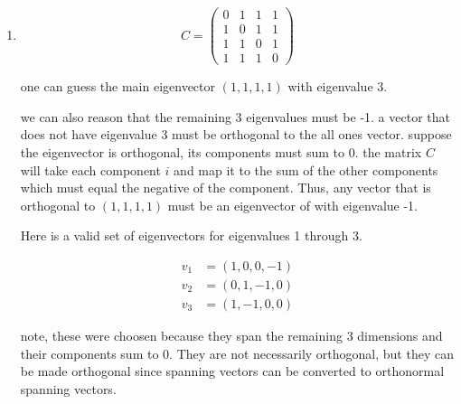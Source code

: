\documentclass{article}
\begin{document}
\begin{enumerate}
for eigenvectors, we know \(v_0=(1,1,1,1)\)

we can also guess \(v_2 = (1,-1,-1,1)\) and it verifies to be correct. 

the final two we can also guess, the diagonal is \(1\pm\sqrt{2}, \pm  \sqrt{2},\pm \sqrt{2}, 1\pm \sqrt{2}\)

\begin{equation}
  v_1 = (-1,1-\sqrt{2},-1+\sqrt{2},1)
\end{equation}

\begin{equation}
  v_3 = (-1,1+\sqrt{2},-1-\sqrt{2},1)
\end{equation}

\item 

  \begin{equation}
    C = \begin{pmatrix}
    0 & 1 & 1 & 1 \\
    1 & 0 & 1 & 1 \\
    1 & 1 & 0 & 1 \\
    1 & 1 & 1 & 0
    \end{pmatrix}
  \end{equation}

  one can guess the main eigenvector \((1,1,1,1)\) with eigenvalue 3. 

  we can also reason that the remaining 3 eigenvalues must be -1. 
  a vector that does not have eigenvalue 3 must be orthogonal to the all ones vector. suppose the eigenvector is orthogonal, its components must sum to 0. the matrix \(C\) will take each component \(i\) and map it to the sum of the other components which must equal the negative of the component. Thus, any vector that is orthogonal to \((1,1,1,1)\) must be an eigenvector of with eigenvalue -1. 

  Here is a valid set of eigenvectors for eigenvalues 1 through 3. 

  \begin{equation}
    \begin{split}
      v_1 &= (1,0,0,-1)\\
      v_2 &= (0,1,-1,0)\\
      v_3 &= (1,-1,0,0)
    \end{split}
  \end{equation}

  note, these were choosen because they span the remaining 3 dimensions and their components sum to 0. They are not necessarily orthogonal, but they can be made orthogonal since spanning vectors can be converted to orthonormal spanning vectors. 
  

\end{enumerate}
\end{document}

